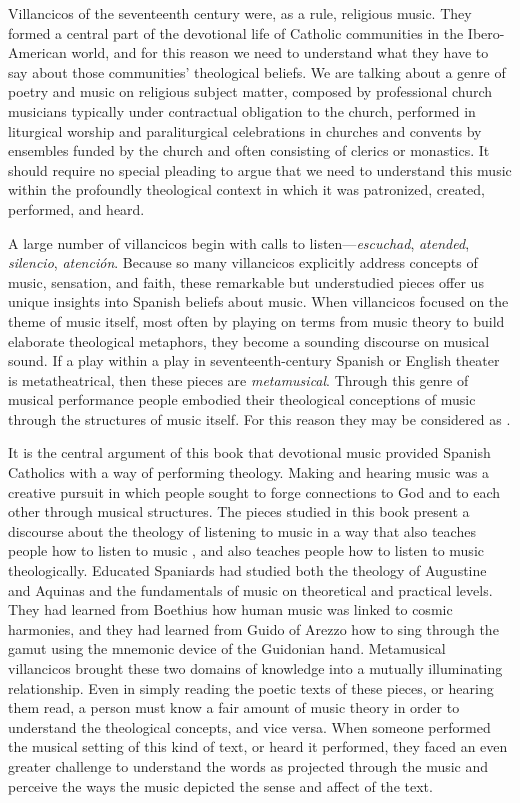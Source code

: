 Villancicos of the seventeenth century were, as a rule, religious music.
They formed a central part of the devotional life of Catholic communities in
the Ibero-American world, and for this reason we need to understand what they
have to say about those communities' theological beliefs. 
We are talking about a genre of poetry and music on religious subject matter,
composed by professional church musicians typically under contractual
obligation to the church, performed in liturgical worship and paraliturgical
celebrations in churches and convents by ensembles funded by the church and
often consisting of clerics or monastics.
It should require no special pleading to argue that we need to understand this
music within the profoundly theological context in which it was patronized,
created, performed, and heard.

A large number of villancicos begin with calls to listen---\emph{escuchad},
\emph{atended}, \emph{silencio}, \emph{atención}. 
Because so many villancicos explicitly address concepts of music, sensation, and
faith, these remarkable but understudied pieces offer us unique insights into
Spanish beliefs about music.
When villancicos focused on the theme of music itself, most often by playing on
terms from music theory to build elaborate theological metaphors, they become a
sounding discourse on musical sound.
If a play within a play in seventeenth-century Spanish or English theater is
metatheatrical, then these pieces are \emph{metamusical}.
Through this genre of musical performance people embodied their theological
conceptions of music through the structures of music itself.
For this reason they may be considered as .

It is the central argument of this book that devotional music provided Spanish
Catholics with a way of performing theology. 
Making and hearing music was a creative pursuit in which people sought to forge
connections to God and to each other through musical structures.
The pieces studied in this book present a discourse about the theology of
listening to music in a way that also teaches people how to listen to music ,
and also teaches people how to listen to music theologically.
Educated Spaniards had studied both the theology of Augustine and Aquinas and  
the fundamentals of music on theoretical and practical levels. 
They had learned from Boethius how human music was linked to cosmic harmonies,
and they had learned from Guido of Arezzo how to sing through the gamut using
the mnemonic device of the Guidonian hand.
Metamusical villancicos brought these two domains of knowledge into a mutually
illuminating relationship.
Even in simply reading the poetic texts of these pieces, or hearing them read,
a person must know a fair amount of music theory in order to understand the
theological concepts, and vice versa.
When someone performed the musical setting of this kind of text, or heard it
performed, they faced an even greater challenge to understand the words as
projected through the music and perceive the ways the music depicted the sense
and affect of the text. 

